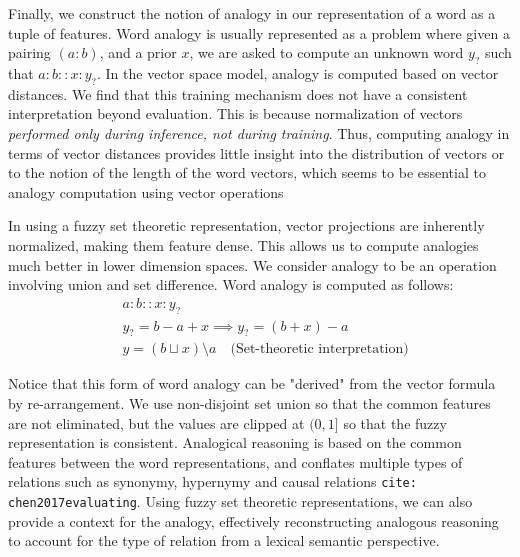 \documentclass[11pt]{book}
\newcommand{\citep}[1]{\texttt{cite: #1}}
\begin{document}
Finally, we construct the notion of analogy in our representation of a word as
a tuple of features. Word analogy is usually represented as a problem where
given a pairing $(a : b)$, and a prior $x$, we are asked to compute an unknown
word $y_?$ such that  $a:b::x:y_?$. In the vector space model, analogy is
computed based on vector distances. We find that this training mechanism does
not have a consistent interpretation beyond evaluation. This is because
normalization of vectors \emph{performed only during inference, not during
training}. Thus, computing analogy in terms of vector distances provides little
insight into the distribution of vectors or to the notion of the length of the
word vectors, which seems to be essential to analogy computation using vector
operations

In using a fuzzy set theoretic representation, vector projections are
inherently normalized, making them feature dense. This allows us to compute
analogies much better in lower dimension spaces. We consider analogy to be an
operation involving union and set difference. Word analogy is computed as
follows:
\begin{equation*}
\begin{split}
    &a : b :: x : y_? \\
    &y_? = b - a + x \implies y_? = (b + x) - a \\
    &y = (b \sqcup x) \setminus a \quad \text{(Set-theoretic interpretation)}
\end{split}
\end{equation*}

Notice that this form of word analogy can be "derived" from the vector formula
by re-arrangement. We use non-disjoint set union so that the common features
are not eliminated, but the values are clipped at $(0,1]$ so that the fuzzy
representation is consistent. Analogical reasoning is based on the common
features between the word representations, and conflates multiple types of
relations such as synonymy, hypernymy and causal relations
\citep{chen2017evaluating}. Using fuzzy set theoretic representations, we can
also provide a context for the analogy, effectively reconstructing analogous
reasoning to account for the type of relation from a lexical semantic
perspective.
\end{document}
